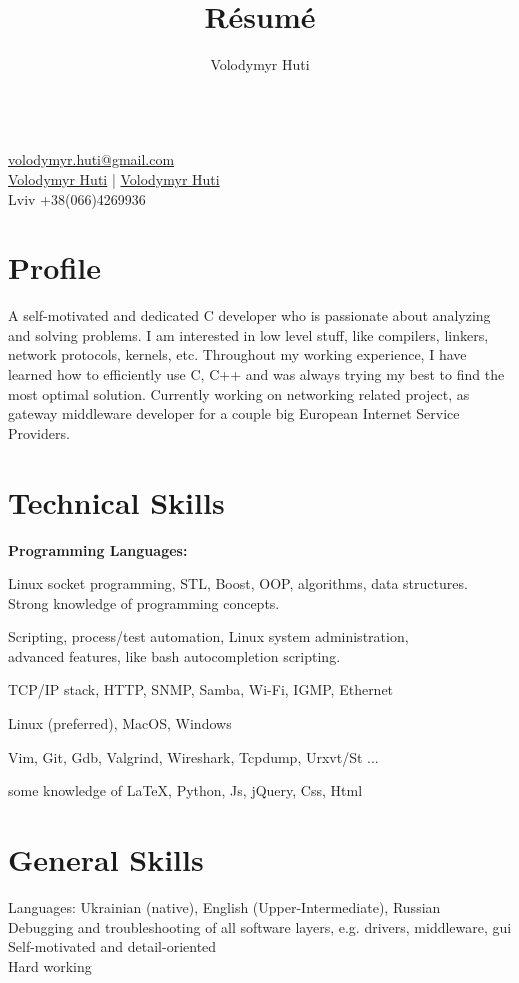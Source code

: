 \documentclass{article}
\author{Volodymyr Huti}
\title{R\'esum\'e}
\date{}
\makeatletter
\renewcommand{\maketitle}{
    \begin{center}
    {\huge\bfseries\theauthor}\\
    \vspace{.25em}
    \href{volodymyr.huti@gmail.com}{\faMailForward{} volodymyr.huti@gmail.com}\\
    \href{https://github.com/volodymyrhuti }{\faGithub{} Volodymyr Huti} |
    \href{https://www.linkedin.com/in/volodymyr-huti-b03a41156/}{\faLinkedinSquare{} Volodymyr Huti}\\
    Lviv +38(066)4269936 \\
    \end{center}
}
\makeatother
\begin{document}
\thispagestyle{empty}       %
\maketitle


\section{Profile}
A self-motivated and dedicated C developer who is passionate about analyzing and solving problems.
I am interested in low level stuff, like compilers, linkers, network protocols, kernels, etc.
Throughout my working experience, I have learned how to efficiently use C, C++  and was always trying
my best to find the most optimal solution. Currently working on networking related project, as gateway
middleware developer for a couple big European Internet Service Providers.

\section{Technical Skills}
\textbf{Programming Languages:}
\begin{description}[align=left,leftmargin=3.8cm,style=multiline]
\item[C/C++] Linux socket programming, STL, Boost, OOP, algorithms, data structures.\\
             Strong knowledge of programming concepts.
\item[Shell] Scripting, process/test automation, Linux system administration,\\
             advanced features, like bash autocompletion scripting.\\
\item[Networking:] TCP/IP stack, HTTP, SNMP, Samba, Wi-Fi, IGMP, Ethernet
\item[Operating System:] Linux (preferred), MacOS, Windows
\item[Development Tools:] Vim, Git, Gdb, Valgrind, Wireshark, Tcpdump, Urxvt/St ...
\item[General:] some knowledge of \LaTeX, Python, Js, jQuery, Css, Html
\end{description}

\section{General Skills}
Languages: Ukrainian (native), English (Upper-Intermediate), Russian\\
Debugging and troubleshooting of all software layers, e.g. drivers, middleware, gui\\
Self-motivated and detail-oriented\\
Hard working
\end{document}

